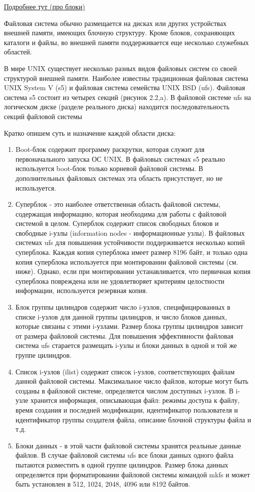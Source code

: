 \href{https://docstore.mik.ua/unix2/glava_13.htm}{Подробнее тут (про блоки)}

Файловая система обычно размещается на дисках или других устройствах внешней памяти, имеющих блочную структуру. Кроме блоков, сохраняющих каталоги и файлы, во внешней памяти поддерживается еще несколько служебных областей. 

В мире UNIX существует несколько разных видов файловых систем со своей структурой внешней памяти. Наиболее известны традиционная файловая система UNIX System V (s5) и файловая система семейства UNIX BSD (ufs). Файловая система s5 состоит из четырех секций (рисунок 2.2,a). В файловой системе ufs на логическом диске (разделе реального диска) находится последовательность секций файловой системы 

Кратко опишем суть и назначение каждой области диска:
\begin{enumerate}
	\item Boot-блок содержит программу раскрутки, которая служит для первоначального запуска ОС UNIX. В файловых системах s5 реально используется boot-блок только корневой файловой системы. В дополнительных файловых системах эта область присутствует, но не используется.
	\item Суперблок - это наиболее ответственная область файловой системы, содержащая информацию, которая необходима для работы с файловой системой в целом. Суперблок содержит список свободных блоков и свободные i-узлы (information nodes - информационные узлы). В файловых системах ufs для повышения устойчивости поддерживается несколько копий суперблока. Каждая копия суперблока имеет размер 8196 байт, и только одна копия суперблока используется при монтировании файловой системы (см. ниже). Однако, если при монтировании устанавливается, что первичная копия суперблока повреждена или не удовлетворяет критериям целостности информации, используется резервная копия. 
	\item Блок группы цилиндров содержит число i-узлов, специфицированных в списке i-узлов для данной группы цилиндров, и число блоков данных, которые связаны с этими i-узлами. Размер блока группы цилиндров зависит от размера файловой системы. Для повышения эффективности файловая система ufs старается размещать i-узлы и блоки данных в одной и той же группе цилиндров. 
	\item Список i-узлов (ilist) содержит список i-узлов, соответствующих файлам данной файловой системы. Максимальное число файлов, которые могут быть созданы в файловой системе, определяется числом доступных i-узлов. В i-узле хранится информация, описывающая файл: режимы доступа к файлу, время создания и последней модификации, идентификатор пользователя и идентификатор группы создателя файла, описание блочной структуры файла и т.д.
	\item Блоки данных - в этой части файловой системы хранятся реальные данные файлов. В случае файловой системы ufs все блоки данных одного файла пытаются разместить в одной группе цилиндров. Размер блока данных определяется при форматировании файловой системы командой mkfs и может быть установлен в 512, 1024, 2048, 4096 или 8192 байтов. 
\end{enumerate}

